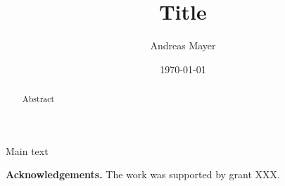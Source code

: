 \documentclass[superscriptaddress,twocolumn,pre]{revtex4}
\begin{document}
\title{Title}
\author{Andreas Mayer} 
\address{}
\date{\today}

\begin{abstract}
    Abstract
\end{abstract}

\maketitle


Main text

{\bf Acknowledgements.}
The work was supported by grant XXX. 


\end{document}

